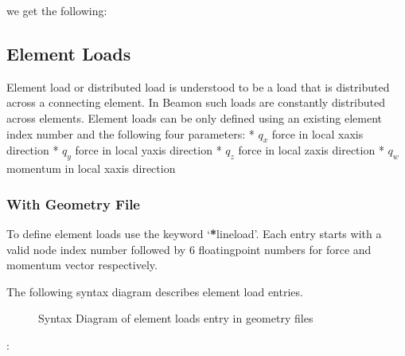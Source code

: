 \documentclass[letterpaper,10pt,english]{sphinxmanual}
\begin{document}
we get the following:

\noindent{}


\subsection{Element Loads}
\label{\detokenize{making_a_model:element-loads}}
Element load or distributed load is understood to be a load that is distributed across a connecting element.
In Beamon such loads are constantly distributed across elements.
Element loads can be only defined using an existing element index number and the following four parameters:
* \(q_x\) force in local x\sphinxhyphen{}axis direction
* \(q_y\) force in local y\sphinxhyphen{}axis direction
* \(q_z\) force in local z\sphinxhyphen{}axis direction
* \(q_w\) momentum in local x\sphinxhyphen{}axis direction


\subsubsection{With Geometry File}
\label{\detokenize{making_a_model:id15}}
To define element loads use the keyword ‘{\color{red}\bfseries{}*}lineload’. Each entry starts with a valid node index number followed by 6
floating\sphinxhyphen{}point numbers for force and momentum vector respectively.

The following syntax diagram describes element load entries.

\begin{figure}[htbp]
\centering
\capstart

\noindent{}
\caption{Syntax Diagram of element loads entry in geometry files}\label{\detokenize{making_a_model:id26}}\end{figure}

:

\begin{sphinxVerbatim}[commandchars=\\\{\}]
\end{sphinxVerbatim}
\end{document}
